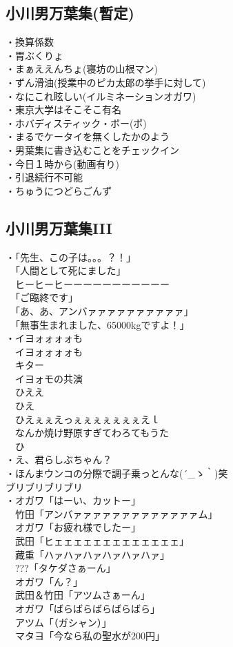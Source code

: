 \subsection{小川男万葉集(暫定)}
・換算係数 \\
・胃ぶくりょ\\ 
・まぁええんちょ(寝坊の山根マン)\\
・ずん滑油(授業中のピカ太郎の挙手に対して)\\
・なにこれ眩しい(イルミネーションオガワ) \\
・東京大学はそこそこ有名\\
・ホバディスティック・ボー(ポ)\\
・まるでケータイを無くしたかのよう\\
・男葉集に書き込むことをチェックイン\\
・今日１時から(動画有り)\\
・引退続行不可能\\
・ちゅうにつどらごんず\\

\newpage
\subsection{小川男万葉集III}
・「先生、この子は。。。？！」\\
　「人間として死にました」\\
　ヒーヒーヒーーーーーーーーーーー\\
　「ご臨終です」\\
　「あ、あ、アンバァァァァァァァァァァ」\\
　「無事生まれました、65000kgですよ！」\\
・イヨォォォォも\\
　イヨォォォォも\\
　キター\\
　イヨォモの共演\\
　ひええ\\
　ひえ\\
　ひえぇぇえっぇぇぇぇぇぇぇえｌ\\
　なんか焼け野原すぎてわろてもうた\\
　ひ\\
・え、君らしぶちゃん？\\
・ほんまウンコの分際で調子乗っとんな{\sf (´\_ゝ｀)}笑\\
    ブリブリブリブリ\\
・オガワ「はーい、カットー」\\
　竹田「アンバァァァァァァァァァァァァァム」\\
　オガワ「お疲れ様でしたー」\\
　武田「ヒェェェェェェェェェェェェェ」\\
　藏重「ハァハァハァハァハァハァ」\\
　???「タケダさぁーん」\\
　オガワ「ん？」\\
　武田＆竹田「アツムさぁーん」\\
　オガワ「ばらばらばらばらばら」\\
　アツム「（ガシャン）」\\
　マタヨ「今なら私の聖水が200円」\\


